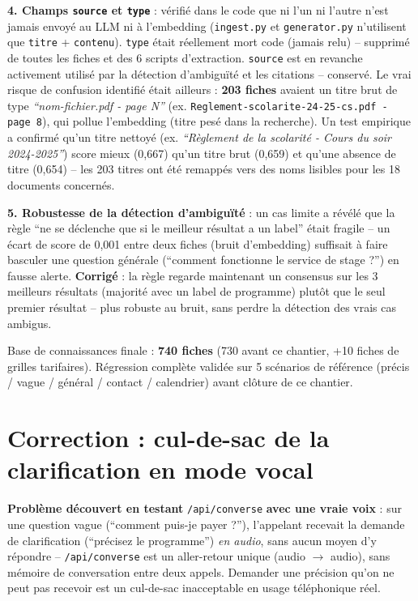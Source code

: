 \documentclass[11pt,a4paper]{report}
\begin{document}
\textbf{4. Champs \texttt{source} et \texttt{type}} : vérifié dans le code que ni l'un ni
l'autre n'est jamais envoyé au LLM ni à l'embedding (\texttt{ingest.py} et
\texttt{generator.py} n'utilisent que \texttt{titre} + \texttt{contenu}). \texttt{type}
était réellement mort code (jamais relu) -- supprimé de toutes les fiches et des 6 scripts
d'extraction. \texttt{source} est en revanche activement utilisé par la détection
d'ambiguïté et les citations -- conservé. Le vrai risque de confusion identifié était
ailleurs : \textbf{203 fiches} avaient un titre brut de type
\emph{``nom-fichier.pdf - page N''} (ex. \texttt{Reglement-scolarite-24-25-cs.pdf - page
8}), qui pollue l'embedding (titre pesé dans la recherche). Un test empirique a confirmé
qu'un titre nettoyé (ex. \emph{``Règlement de la scolarité - Cours du soir
2024-2025''}) score mieux (0,667) qu'un titre brut (0,659) et qu'une absence de titre
(0,654) -- les 203 titres ont été remappés vers des noms lisibles pour les 18 documents
concernés.

\textbf{5. Robustesse de la détection d'ambiguïté} : un cas limite a révélé que la règle
``ne se déclenche que si le meilleur résultat a un label'' était fragile -- un écart de
score de 0{,}001 entre deux fiches (bruit d'embedding) suffisait à faire basculer une
question générale (``comment fonctionne le service de stage ?'') en fausse alerte.
\textbf{Corrigé} : la règle regarde maintenant un consensus sur les 3 meilleurs résultats
(majorité avec un label de programme) plutôt que le seul premier résultat -- plus robuste
au bruit, sans perdre la détection des vrais cas ambigus.

Base de connaissances finale : \textbf{740 fiches} (730 avant ce chantier, +10 fiches de
grilles tarifaires). Régression complète validée sur 5 scénarios de référence (précis /
vague / général / contact / calendrier) avant clôture de ce chantier.

\section{Correction : cul-de-sac de la clarification en mode vocal}
\textbf{Problème découvert en testant} \texttt{/api/converse} \textbf{avec une vraie
voix} : sur une question vague (``comment puis-je payer ?''), l'appelant recevait la
demande de clarification (``précisez le programme'') \emph{en audio}, sans aucun moyen
d'y répondre -- \texttt{/api/converse} est un aller-retour unique (audio $\to$ audio),
sans mémoire de conversation entre deux appels. Demander une précision qu'on ne peut pas
recevoir est un cul-de-sac inacceptable en usage téléphonique réel.
\end{document}
